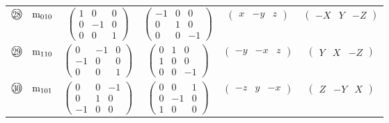 \documentclass[fleqn,10pt,landscape]{jsarticle}
\begin{document}
\begin{center}
\begin{longtable}{lcccc}
$ {\ooalign{\hfil\resizebox{.8\width}{\height}{28}\hfil\crcr\raise.1ex\hbox{\large$\bigcirc$}}}\quad {\rm m}_{010} $ & $ \begin{pmatrix} 1 & 0 & 0 \\ 0 & -1 & 0 \\ 0 & 0 & 1 \end{pmatrix} $ & $ \begin{pmatrix} -1 & 0 & 0 \\ 0 & 1 & 0 \\ 0 & 0 & -1 \end{pmatrix} $ & $ \begin{pmatrix} x & - y & z \end{pmatrix} $ & $ \begin{pmatrix} - X & Y & - Z \end{pmatrix} $ \\
$ {\ooalign{\hfil\resizebox{.8\width}{\height}{29}\hfil\crcr\raise.1ex\hbox{\large$\bigcirc$}}}\quad {\rm m}_{110} $ & $ \begin{pmatrix} 0 & -1 & 0 \\ -1 & 0 & 0 \\ 0 & 0 & 1 \end{pmatrix} $ & $ \begin{pmatrix} 0 & 1 & 0 \\ 1 & 0 & 0 \\ 0 & 0 & -1 \end{pmatrix} $ & $ \begin{pmatrix} - y & - x & z \end{pmatrix} $ & $ \begin{pmatrix} Y & X & - Z \end{pmatrix} $ \\
$ {\ooalign{\hfil\resizebox{.8\width}{\height}{30}\hfil\crcr\raise.1ex\hbox{\large$\bigcirc$}}}\quad {\rm m}_{101} $ & $ \begin{pmatrix} 0 & 0 & -1 \\ 0 & 1 & 0 \\ -1 & 0 & 0 \end{pmatrix} $ & $ \begin{pmatrix} 0 & 0 & 1 \\ 0 & -1 & 0 \\ 1 & 0 & 0 \end{pmatrix} $ & $ \begin{pmatrix} - z & y & - x \end{pmatrix} $ & $ \begin{pmatrix} Z & - Y & X \end{pmatrix} $ \\

\end{longtable}
\end{center}
\end{document}
